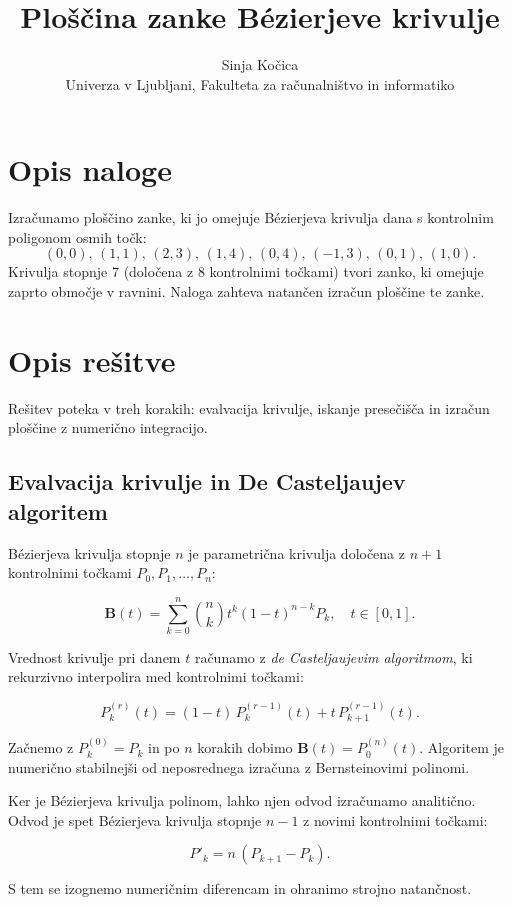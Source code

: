 \documentclass[a4paper, twocolumn]{article}
\title{\textbf{Ploščina zanke Bézierjeve krivulje}}
\author{Sinja Kočica\\
\small Univerza v Ljubljani, Fakulteta za računalništvo in informatiko}
\date{}
\begin{document}
\maketitle

\section{Opis naloge}

Izračunamo ploščino zanke, ki jo omejuje Bézierjeva krivulja dana s kontrolnim poligonom osmih točk:
\[
(0,0),\,(1,1),\,(2,3),\,(1,4),\,(0,4),\,(-1,3),\,(0,1),\,(1,0).
\]
Krivulja stopnje 7 (določena z 8 kontrolnimi točkami) tvori zanko, ki omejuje zaprto območje v ravnini. Naloga zahteva natančen izračun ploščine te zanke.

\section{Opis rešitve}

Rešitev poteka v treh korakih: evalvacija krivulje, iskanje presečišča in izračun ploščine z numerično integracijo.

\subsection{Evalvacija krivulje in De Casteljaujev algoritem}

Bézierjeva krivulja stopnje $n$ je parametrična krivulja določena z $n+1$ kontrolnimi točkami $P_0, P_1, \ldots, P_n$:

\[
\mathbf{B}(t) = \sum_{k=0}^{n} \binom{n}{k} t^k (1-t)^{n-k} P_k,
\quad t \in [0, 1].
\]

Vrednost krivulje pri danem $t$ računamo z \emph{de Casteljaujevim algoritmom}, ki rekurzivno interpolira med kontrolnimi točkami:

\[
P_k^{(r)}(t) = (1-t)\, P_k^{(r-1)}(t) + t\, P_{k+1}^{(r-1)}(t).
\]

Začnemo z $P_k^{(0)} = P_k$ in po $n$ korakih dobimo $\mathbf{B}(t) = P_0^{(n)}(t)$. Algoritem je numerično stabilnejši od neposrednega izračuna z Bernsteinovimi polinomi.

Ker je Bézierjeva krivulja polinom, lahko njen odvod izračunamo analitično. Odvod je spet Bézierjeva krivulja stopnje $n-1$ z novimi kontrolnimi točkami:

\[
P'_k = n\,(P_{k+1} - P_k).
\]

S tem se izognemo numeričnim diferencam in ohranimo strojno natančnost.
\end{document}
